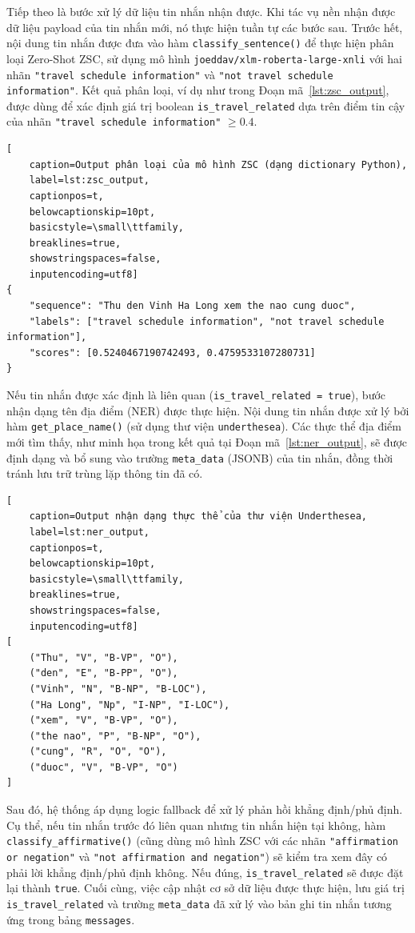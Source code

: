 Tiếp theo là bước xử lý dữ liệu tin nhắn nhận được. Khi tác vụ nền nhận được dữ liệu payload của tin nhắn mới, nó thực hiện tuần tự các bước sau. Trước hết, nội dung tin nhắn được đưa vào hàm \texttt{classify\_sentence()} để thực hiện phân loại Zero-Shot  ZSC, sử dụng mô hình \texttt{joeddav/xlm-roberta-large-xnli} với hai nhãn \texttt{"travel schedule information"} và \texttt{"not travel schedule information"}. Kết quả phân loại, ví dụ như trong Đoạn mã~\ref{lst:zsc_output}, được dùng để xác định giá trị boolean \texttt{is\_travel\_related} dựa trên điểm tin cậy của nhãn \texttt{"travel schedule information"} $\geq 0.4$.

\lstset{language=json}
\begin{lstlisting}[
    caption=Output phân loại của mô hình ZSC (dạng dictionary Python),
    label=lst:zsc_output,
    captionpos=t,
    belowcaptionskip=10pt,
    basicstyle=\small\ttfamily,
    breaklines=true,
    showstringspaces=false,
    inputencoding=utf8]
{
    "sequence": "Thu den Vinh Ha Long xem the nao cung duoc",
    "labels": ["travel schedule information", "not travel schedule information"],
    "scores": [0.5240467190742493, 0.4759533107280731]
}
\end{lstlisting}

\noindent Nếu tin nhắn được xác định là liên quan (\texttt{is\_travel\_related = true}), bước nhận dạng tên địa điểm (NER) được thực hiện. Nội dung tin nhắn được xử lý bởi hàm \texttt{get\_place\_name()} (sử dụng thư viện \texttt{underthesea}). Các thực thể địa điểm mới tìm thấy, như minh họa trong kết quả tại Đoạn mã~\ref{lst:ner_output}, sẽ được định dạng và bổ sung vào trường \texttt{meta\_data} (JSONB) của tin nhắn, đồng thời tránh lưu trữ trùng lặp thông tin đã có.

\lstset{language=Python} %
\begin{lstlisting}[
    caption=Output nhận dạng thực thể của thư viện Underthesea,
    label=lst:ner_output,
    captionpos=t,
    belowcaptionskip=10pt,
    basicstyle=\small\ttfamily,
    breaklines=true,
    showstringspaces=false,
    inputencoding=utf8]
[
    ("Thu", "V", "B-VP", "O"),
    ("den", "E", "B-PP", "O"),
    ("Vinh", "N", "B-NP", "B-LOC"),
    ("Ha Long", "Np", "I-NP", "I-LOC"),
    ("xem", "V", "B-VP", "O"),
    ("the nao", "P", "B-NP", "O"),
    ("cung", "R", "O", "O"),
    ("duoc", "V", "B-VP", "O")
]
\end{lstlisting}

\noindent Sau đó, hệ thống áp dụng logic fallback để xử lý phản hồi khẳng định/phủ định. Cụ thể, nếu tin nhắn trước đó liên quan nhưng tin nhắn hiện tại không, hàm \texttt{classify\_affirmative()} (cũng dùng mô hình ZSC với các nhãn \texttt{"affirmation or negation"} và \texttt{"not affirmation and negation"}) sẽ kiểm tra xem đây có phải lời khẳng định/phủ định không. Nếu đúng, \texttt{is\_travel\_related} sẽ được đặt lại thành \texttt{true}. Cuối cùng, việc cập nhật cơ sở dữ liệu được thực hiện, lưu giá trị \texttt{is\_travel\_related} và trường \texttt{meta\_data} đã xử lý vào bản ghi tin nhắn tương ứng trong bảng \texttt{messages}. %

